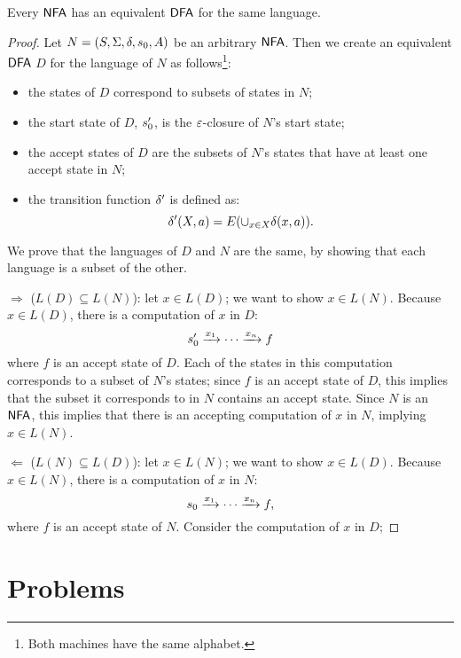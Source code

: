 \begin{theorem}
	Every $\textsf{NFA}$ has an equivalent $\textsf{DFA}$ for the same language.
\end{theorem}

\begin{proof}
	Let $N = (S, \Sigma, \delta, s_0, A)$ be an arbitrary $\textsf{NFA}$.
	Then we create an equivalent $\textsf{DFA}$ $D$ for the language of $N$ as follows\footnote{Both machines have the same alphabet.}:
	\begin{itemize}
		\item the states of $D$ correspond to subsets of states in $N$;
		\item the start state of $D$, $s_0'$, is the $\varepsilon$-closure of $N$'s start state;
		\item the accept states of $D$ are the subsets of $N$'s states that have at least one accept state in $N$;
		\item the transition function $\delta'$ is defined as:
		\[
			\delta'(X, a) = E(\cup_{x \in X} \delta(x, a)).
		\]
	\end{itemize}

We prove that the languages of $D$ and $N$ are the same, by showing that each language is a subset of the other.

$\Rightarrow$ ($L(D) \subseteq L(N)$): let $x \in L(D)$; we want to show $x \in L(N)$.
Because $x \in L(D)$, there is a computation of $x$ in $D$:
\[
	s_0' \xrightarrow{x_1} \cdots \xrightarrow{x_n} f
\]
where $f$ is an accept state of $D$.
Each of the states in this computation corresponds to a subset of $N$'s states; since $f$ is an accept state of $D$, this implies that the subset it corresponds to in $N$ contains an accept state. 
Since $N$ is an $\textsf{NFA}$, this implies that there is an accepting computation of $x$ in $N$, implying $x \in L(N)$.

$\Leftarrow$ ($L(N) \subseteq L(D)$): let $x \in L(N)$; we want to show $x \in L(D)$.
Because $x \in L(N)$, there is a computation of $x$ in $N$:
\[
	s_0 \xrightarrow{x_1} \cdots \xrightarrow{x_n} f,
\]
where $f$ is an accept state of $N$.
Consider the computation of $x$ in $D$; 

\end{proof}

\section{Problems}
